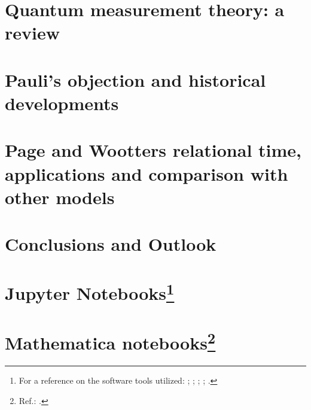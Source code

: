 \chapter{Quantum measurement theory: a review}\label{ch:decohere}





%



\chapter{Pauli's objection and historical developments}\label{ch:hist}






\chapter[%
  Page and Wootters relational time and applications
  ]{
    Page and Wootters relational time, applications and comparison with other models
  }
  \label{ch:pw}\label{ch:detect}








\chapter{Conclusions and Outlook}\label{ch:outlook}




\appendix

\chapter[Jupyter Notebooks]{Jupyter Notebooks\footnote{
  For a reference on the software tools utilized:
  \cite{comp:scipy};
  \cite{comp:sympy};
  \cite{comp:jupyter};
  \cite{comp:matplotlib};
  \cite{comp:numpy}.
}}






\chapter[Mathematica notebooks]{Mathematica notebooks\footnote{
  Ref.: \cite{Wolfram}.
}}



\printbibliography[heading=bibintoc]


